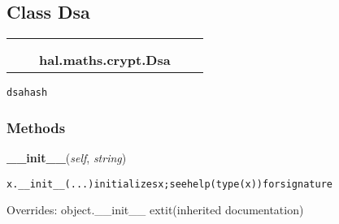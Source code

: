 \subsection{Class Dsa}

    \label{hal:maths:crypt:Dsa}
\begin{tabular}{cccccc}
\multicolumn{2}{r}{\settowidth{\BCL}{object}\multirow{2}{\BCL}{object}}
&&
  \\\cline{3-3}
  &&\multicolumn{1}{c|}{}
&&
  \\
&&\multicolumn{2}{l}{\textbf{hal.maths.crypt.Dsa}}
\end{tabular}

\begin{alltt}
dsa hash 
\end{alltt}



  \subsubsection{Methods}

    \vspace{0.5ex}

\hspace{.8\funcindent}\begin{boxedminipage}{\funcwidth}

    \raggedright \textbf{\_\_init\_\_}(\textit{self}, \textit{string})

\setlength{\parskip}{2ex}
\begin{alltt}
x.\_\_init\_\_(...) initializes x; see help(type(x)) for signature
\end{alltt}

\setlength{\parskip}{1ex}
      Overrides: object.\_\_init\_\_ 	extit{(inherited documentation)}

    \end{boxedminipage}

    \label{hal:maths:crypt:Dsa:hash}


